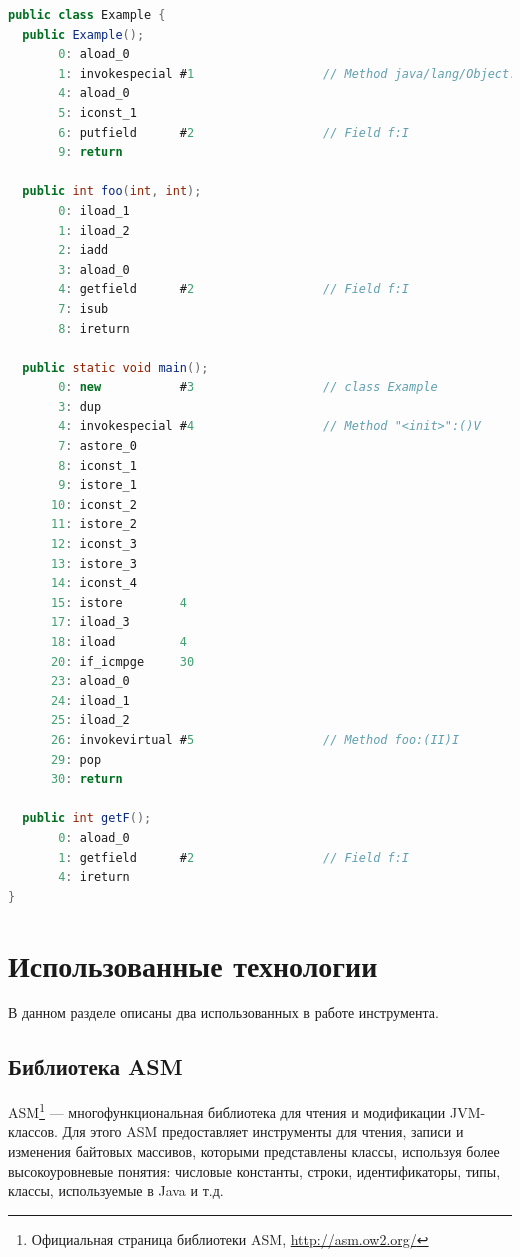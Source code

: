 \documentclass[14pt]{extarticle}
\begin{document}
\newpage
\begin{lstlisting}[label=JVM-example,caption=Представление класса в JVM, frame = single, language = Java]
public class Example {
  public Example();
       0: aload_0
       1: invokespecial #1                  // Method java/lang/Object."<init>":()V
       4: aload_0
       5: iconst_1
       6: putfield      #2                  // Field f:I
       9: return

  public int foo(int, int);
       0: iload_1
       1: iload_2
       2: iadd
       3: aload_0
       4: getfield      #2                  // Field f:I
       7: isub
       8: ireturn

  public static void main();
       0: new           #3                  // class Example
       3: dup
       4: invokespecial #4                  // Method "<init>":()V
       7: astore_0
       8: iconst_1
       9: istore_1
      10: iconst_2
      11: istore_2
      12: iconst_3
      13: istore_3
      14: iconst_4
      15: istore        4
      17: iload_3
      18: iload         4
      20: if_icmpge     30
      23: aload_0
      24: iload_1
      25: iload_2
      26: invokevirtual #5                  // Method foo:(II)I
      29: pop
      30: return

  public int getF();
       0: aload_0
       1: getfield      #2                  // Field f:I
       4: ireturn
}
\end{lstlisting}


\pagebreak
\section{Использованные технологии}
В данном разделе описаны два использованных в работе инструмента.

\subsection{Библиотека ASM}
ASM\footnote{Официальная страница библиотеки ASM, \url{http://asm.ow2.org/}} \cite{asm_guide} --- многофункциональная библиотека для чтения и модификации JVM-классов. Для этого ASM предоставляет инструменты для чтения, записи и изменения байтовых массивов, которыми представлены классы, используя более высокоуровневые понятия: числовые константы, строки, идентификаторы, типы, классы, используемые в Java и т.д. 
\end{document}
